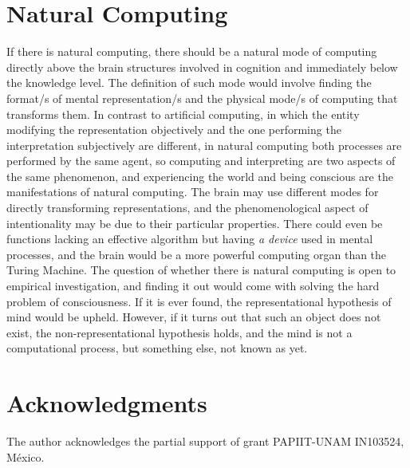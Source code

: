 \documentclass[11pt]{article}
\begin{document}
\section{Natural Computing}
\label{sec:natural-comp}

If there is natural computing, there should be a natural mode of computing directly above the brain structures involved in cognition and immediately below the knowledge level. The definition of such mode would involve finding the format/s of mental representation/s and the physical mode/s of computing that transforms them. In contrast to artificial computing, in which the entity modifying the representation objectively and the one performing the interpretation subjectively are different, in natural computing both processes are performed by the same agent, so computing and interpreting are two aspects of the same phenomenon, and experiencing the world and being conscious are the manifestations of natural computing. The brain may use different modes for directly transforming representations, and the phenomenological aspect of intentionality may be due to their particular properties. There could even be functions lacking an effective algorithm but having \emph{a device} used in mental processes, and the brain would be a more powerful computing organ than the Turing Machine. The question of whether there is natural computing is open to empirical investigation, and finding it out would come with solving the hard problem of consciousness. If it is ever found, the representational hypothesis of mind would be upheld. However, if it turns out that such an object does not exist, the non-representational hypothesis holds, and the mind is not a computational process, but something else, not known as yet.

\section{Acknowledgments}

The author acknowledges the partial support of grant PAPIIT-UNAM IN103524, México. 

%


\end{document}
